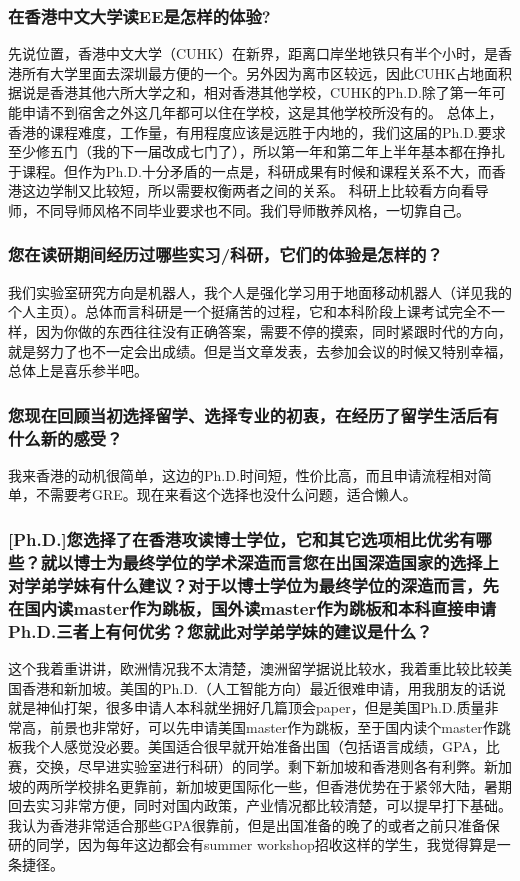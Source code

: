 \documentclass[a4paper,UTF8]{book}
\begin{document}
    \subsubsection*{在香港中文大学读EE是怎样的体验?}
    先说位置，香港中文大学（CUHK）在新界，距离口岸坐地铁只有半个小时，是香港所有大学里面去深圳最方便的一个。另外因为离市区较远，因此CUHK占地面积据说是香港其他六所大学之和，相对香港其他学校，CUHK的Ph.D.除了第一年可能申请不到宿舍之外这几年都可以住在学校，这是其他学校所没有的。
    总体上，香港的课程难度，工作量，有用程度应该是远胜于内地的，我们这届的Ph.D.要求至少修五门（我的下一届改成七门了），所以第一年和第二年上半年基本都在挣扎于课程。但作为Ph.D.十分矛盾的一点是，科研成果有时候和课程关系不大，而香港这边学制又比较短，所以需要权衡两者之间的关系。
    科研上比较看方向看导师，不同导师风格不同毕业要求也不同。我们导师散养风格，一切靠自己。
    \subsubsection*{您在读研期间经历过哪些实习/科研，它们的体验是怎样的？}
    我们实验室研究方向是机器人，我个人是强化学习用于地面移动机器人（详见我的个人主页）。总体而言科研是一个挺痛苦的过程，它和本科阶段上课考试完全不一样，因为你做的东西往往没有正确答案，需要不停的摸索，同时紧跟时代的方向，就是努力了也不一定会出成绩。但是当文章发表，去参加会议的时候又特别幸福，总体上是喜乐参半吧。
    \subsubsection*{您现在回顾当初选择留学、选择专业的初衷，在经历了留学生活后有什么新的感受？}
    我来香港的动机很简单，这边的Ph.D.时间短，性价比高，而且申请流程相对简单，不需要考GRE。现在来看这个选择也没什么问题，适合懒人。
    \subsubsection*{[Ph.D.]您选择了在香港攻读博士学位，它和其它选项相比优劣有哪些？就以博士为最终学位的学术深造而言您在出国深造国家的选择上对学弟学妹有什么建议？对于以博士学位为最终学位的深造而言，先在国内读master作为跳板，国外读master作为跳板和本科直接申请Ph.D.三者上有何优劣？您就此对学弟学妹的建议是什么？}
    这个我着重讲讲，欧洲情况我不太清楚，澳洲留学据说比较水，我着重比较比较美国香港和新加坡。美国的Ph.D.（人工智能方向）最近很难申请，用我朋友的话说就是神仙打架，很多申请人本科就坐拥好几篇顶会paper，但是美国Ph.D.质量非常高，前景也非常好，可以先申请美国master作为跳板，至于国内读个master作跳板我个人感觉没必要。美国适合很早就开始准备出国（包括语言成绩，GPA，比赛，交换，尽早进实验室进行科研）的同学。剩下新加坡和香港则各有利弊。新加坡的两所学校排名更靠前，新加坡更国际化一些，但香港优势在于紧邻大陆，暑期回去实习非常方便，同时对国内政策，产业情况都比较清楚，可以提早打下基础。
    我认为香港非常适合那些GPA很靠前，但是出国准备的晚了的或者之前只准备保研的同学，因为每年这边都会有summer workshop招收这样的学生，我觉得算是一条捷径。
\end{document}
